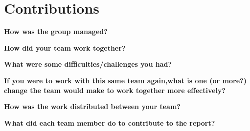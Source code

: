 \section{\textbf{Contributions}} 
\begin{itemize}
\textbf{How was the group managed?}
\end{itemize}

\begin{itemize}
\textbf{How did your team work together?}
\end{itemize}

\begin{itemize}
\textbf{What were some difficulties/challenges you had?}
\end{itemize}

\begin{itemize}
\textbf{If you were to work with this same team again,what is one (or more?) change the team would make to work together more effectively? }
\end{itemize}

\begin{itemize}
\textbf{How was the work distributed between your team? }
\end{itemize}

\begin{itemize}
\textbf{What did each team member do to contribute to the report?}
\end{itemize}
